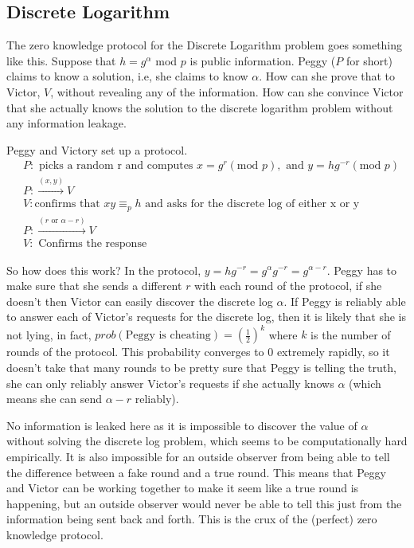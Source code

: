 \documentclass[12pt,a4paper]{article}
\begin{document}
\subsection{Discrete Logarithm}
The zero knowledge protocol for the Discrete Logarithm problem goes something like this. Suppose that $h = g^{\alpha}$ mod $p$ is public information. Peggy ($P$ for short) claims to know a solution, i.e, she claims to know $\alpha$. How can she prove that to Victor, $V$, without revealing any of the information. How can she convince Victor that she actually knows the solution to the discrete logarithm problem without any information leakage. 

Peggy and Victory set up a protocol. 
\begin{align*}
	&P: \text{ picks a random r and computes } x = g^{r} (\text{mod } p), \text{ and } y = hg^{-r} (\text{mod } p) \\
	&P: \xrightarrow{(x,y)} V \\
	&V: \text{confirms that } xy \equiv_{p} h \text{ and asks for the discrete log of either x or y} \\
	&P : \xrightarrow{(r \text{ or } \alpha-r)} V \\
	&V: \text{ Confirms the response} 
\end{align*}

So how does this work? In the protocol, $y = hg^{-r} = g^{\alpha}g^{-r} = g^{\alpha - r}$. Peggy has to make sure that she sends a different $r$ with each round of the protocol, if she doesn't then Victor can easily discover the discrete log $\alpha$. If Peggy is reliably able to answer each of Victor's requests for the discrete log, then it is likely that she is not lying, in fact, $prob(\text{Peggy is cheating}) = \left(\frac{1}{2}\right)^{k}$ where $k$ is the number of rounds of the protocol. This probability converges to 0 extremely rapidly, so it doesn't take that many rounds to be pretty sure that Peggy is telling the truth, she can only reliably answer Victor's requests if she actually knows $\alpha$ (which means she can send $\alpha - r$ reliably). 

No information is leaked here as it is impossible to discover the value of $\alpha$ without solving the discrete log problem, which seems to be computationally hard empirically. It is also impossible for an outside observer from being able to tell the difference between a fake round and a true round. This means that Peggy and Victor can be working together to make it seem like a true round is happening, but an outside observer would never be able to tell this just from the information being sent back and forth. This is the crux of the (perfect) zero knowledge protocol. 
\end{document}
